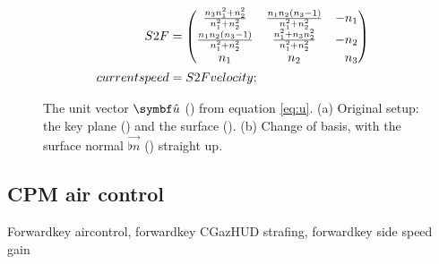 \begin{align*}
S2F &=
\begin{pmatrix}
\frac{n_3 n_1^2 + n_2^2}{n_1^2 + n_2^2} & \frac{n_1 n_2 (n_3 - 1)}{n_1^2 + n_2^2} & -n_1\\
\frac{n_1 n_2 (n_3 - 1)}{n_1^2 + n_2^2} & \frac{n_1^2 + n_3 n_2^2}{n_1^2 + n_2^2} & -n_2\\
n_1 & n_2 & \hphantom{-}n_3
\end{pmatrix}\\
currentspeed &= S2F velocity;
\end{align*}

\begin{figure}[H]
	\centering
	\begin{subfigure}[t]{\textwidth}
		\centering
		\begin{subfigure}[t]{0.5\textwidth}
			\centering
			\setlength\figureheight{6.5cm}
			\setlength\figurewidth{6.5cm}
		\end{subfigure}%
		\begin{subfigure}[t]{0.5\textwidth}
			\centering
			\setlength\figureheight{5cm}
			\setlength\figurewidth{5cm}
		\end{subfigure}
		\caption{}
	\end{subfigure}
	\begin{subfigure}[t]{\textwidth}
		\centering
		\begin{subfigure}[t]{0.5\textwidth}
			\centering
			\setlength\figureheight{6.5cm}
			\setlength\figurewidth{6.5cm}
		\end{subfigure}%
		\begin{subfigure}[t]{0.5\textwidth}
			\centering
			\setlength\figureheight{5cm}
			\setlength\figurewidth{5cm}
		\end{subfigure}
		\caption{}
	\end{subfigure}
	\caption{The unit vector $\uvec{u}$ (\purplearrow) from equation \eqref{eq:u}. (a) Original setup: the key plane (\orangearea) and the surface (\greenarea). (b) Change of basis, with the surface normal $\vec{\flat{n}}$ (\greenarrow) straight up.}
\end{figure}


\subsection{CPM air control}
\label{sec:turnCPM}
Forwardkey aircontrol, forwardkey CGazHUD strafing, forwardkey side speed gain

